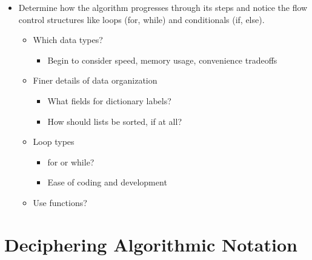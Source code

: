 \documentclass[
  letterpaper,
  DIV=11,
  numbers=noendperiod]{scrreprt}
\providecommand{\tightlist}{%
  \setlength{\itemsep}{0pt}\setlength{\parskip}{0pt}}\usepackage{longtable,booktabs,array}
\begin{document}
\begin{itemize}
\tightlist
\item
  Determine how the algorithm progresses through its steps and notice
  the flow control structures like loops (for, while) and conditionals
  (if, else).

  \begin{itemize}
  \tightlist
  \item
    Which data types?

    \begin{itemize}
    \tightlist
    \item
      Begin to consider speed, memory usage, convenience tradeoffs
    \end{itemize}
  \item
    Finer details of data organization

    \begin{itemize}
    \tightlist
    \item
      What fields for dictionary labels?
    \item
      How should lists be sorted, if at all?
    \end{itemize}
  \item
    Loop types

    \begin{itemize}
    \tightlist
    \item
      for or while?
    \item
      Ease of coding and development
    \end{itemize}
  \item
    Use functions?
  \end{itemize}
\end{itemize}


\chapter{Deciphering Algorithmic
Notation}\label{deciphering-algorithmic-notation}
\end{document}

